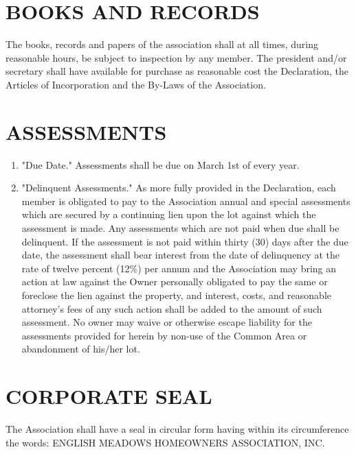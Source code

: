 \documentclass[12pt, letterpaper]{article}
\begin{document}
\section{BOOKS AND RECORDS}
The books, records and papers of the association shall at all times, during reasonable hours, be subject to inspection by any member.
The president and/or secretary shall have available for purchase as reasonable cost the Declaration, the Articles of Incorporation and the By-Laws of the Association.

\section{ASSESSMENTS}
\begin{enumerate}
 \item "Due Date."
  Assessments shall be due on March 1st of every year.
 \item "Delinquent Assessments."
  As more fully provided in the Declaration, each member is obligated to pay to the Association annual and special assessments which are secured by a continuing lien upon the lot against which the assessment is made.
  Any assessments which are not paid when due shall be delinquent.
  If the assessment is not paid within thirty (30) days after the due date, the assessment shall bear interest from the date of delinquency at the rate of twelve percent (12\%) per annum and the Association may bring an action at law against the Owner personally obligated to pay the same or foreclose the lien against the property, and interest, costs, and reasonable attorney's fees of any such action shall be added to the amount of such assessment.  No owner may waive or otherwise escape liability for the assessments provided for herein by non-use of the Common Area or abandonment of his/her lot.
\end{enumerate}

\section{CORPORATE SEAL}
  The Association shall have a seal in circular form having within its circumference the words:
  ENGLISH MEADOWS HOMEOWNERS ASSOCIATION, INC.
\end{document}
